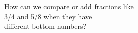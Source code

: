 \documentclass[preview]{standalone}
\begin{document}
\begin{flushleft}
How can we compare or add fractions like\\3/4 and 5/8 when they have\\different bottom numbers?
\end{flushleft}
\end{document}
